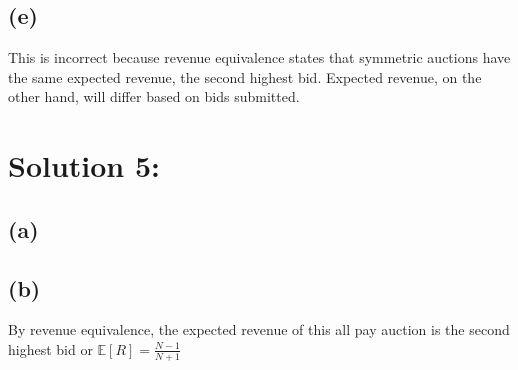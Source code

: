 \documentclass[10pt,a4paper]{article}
\begin{document}
  \subsection*{(e)}
    This is incorrect because revenue equivalence states that symmetric auctions have the same expected revenue, the second highest bid. Expected revenue, on the other hand, will differ based on bids submitted.
\section*{Solution 5:}
  \subsection*{(a)}
    
  \subsection*{(b)}
    By revenue equivalence, the expected revenue of this all pay auction is the second highest bid or $\mathbb{E}[R] = \frac{N-1}{N+1}$
\end{document}
